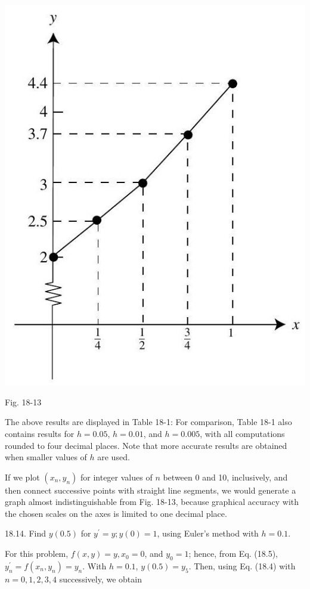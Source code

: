 \documentclass[10pt]{article}
\begin{document}
\begin{center}
\includegraphics[max width=\textwidth]{2024_04_03_5bb5b4275a64cb9887d1g-186}
\end{center}

Fig. 18-13

The above results are displayed in Table 18-1: For comparison, Table 18-1 also contains results for $h=0.05$, $h=0.01$, and $h=0.005$, with all computations rounded to four decimal places. Note that more accurate results are obtained when smaller values of $h$ are used.

If we plot $\left(x_{n}, y_{n}\right)$ for integer values of $n$ between 0 and 10, inclusively, and then connect successive points with straight line segments, we would generate a graph almost indistinguishable from Fig. 18-13, because graphical accuracy with the chosen scales on the axes is limited to one decimal place.

18.14. Find $y(0.5)$ for $y^{\prime}=y ; y(0)=1$, using Euler's method with $h=0.1$.

For this problem, $f(x, y)=y, x_{0}=0$, and $y_{0}=1$; hence, from Eq. (18.5), $y_{n}^{\prime}=f\left(x_{n}, y_{n}\right)=y_{n}$. With $h=0.1$, $y(0.5)=y_{5}$. Then, using Eq. (18.4) with $n=0,1,2,3,4$ successively, we obtain
\end{document}
